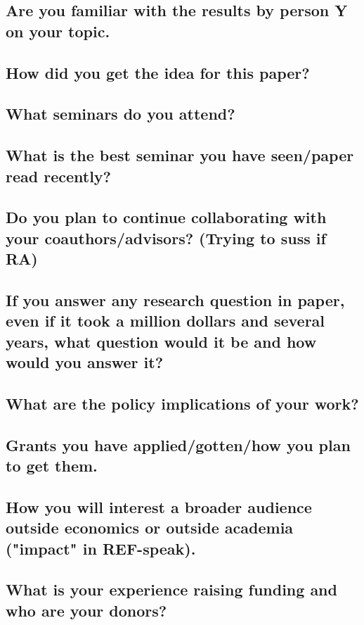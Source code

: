 \documentclass[12pt]{article}
\theoremstyle{plain}
\theoremstyle{plain}
\theoremstyle{plain}
\theoremstyle{plain}
\theoremstyle{plain}
\theoremstyle{plain}
\begin{document}
\subsection{Are you familiar with the results by person Y on your topic.}
\label{sec:orge0134cd}
\subsection{How did you get the idea for this paper?}
\label{sec:org370d3e4}
\subsection{What seminars do you attend?}
\label{sec:orgc456d80}
\subsection{What is the best seminar you have seen/paper read recently?}
\label{sec:orgf745f88}
\subsection{Do you plan to continue collaborating with your coauthors/advisors? (Trying to suss if RA)}
\label{sec:orgeb500f7}
\subsection{If you answer any research question in paper, even if it took a million dollars and several years, what question would it be and how would you answer it?}
\label{sec:org0952407}
\subsection{What are the policy implications of your work?}
\label{sec:orga89d450}
\subsection{Grants you have applied/gotten/how you plan to get them.}
\label{sec:org2092b83}
\subsection{How you will interest a broader audience outside economics or outside academia ("impact" in REF-speak).}
\label{sec:org5365915}
\subsection{What is your experience raising funding and who are your donors?}
\label{sec:org5ed86be}
\end{document}
